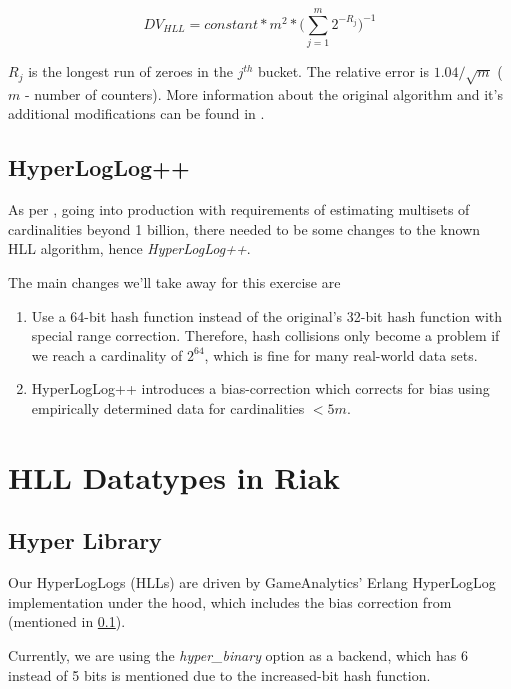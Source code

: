 \documentclass[12pt]{article}
\newlength\tindent
\renewcommand{\indent}{\hspace*{\tindent}}
\begin{document}
$$DV_{HLL} = constant * m^{2} * \Bigg(\sum_{j=1}^{m} 2^{-R_{j}}\Bigg)^{-1}$$

$R_j$ is the longest run of zeroes in the $j^{th}$ bucket. The relative error
is $1.04/\sqrt{m}$ ($m$ - number of counters). More information about the
original algorithm and it's additional modifications can be found in
\cite{Flatjolet:2007:Online}.

\subsection{HyperLogLog++}\label{hll++}

As per \cite{Heule:2013:Online}, going into production with requirements of
estimating multisets of cardinalities beyond 1 billion, there needed to be
some changes to the known HLL algorithm, hence \textit{HyperLogLog++}.\newline

The main changes we'll take away for this exercise are

\begin{enumerate}
\item Use a 64-bit hash function instead of the
  original's\cite{Flatjolet:2007:Online} 32-bit hash function with special range
  correction. Therefore, hash collisions only become a problem if we reach a
  cardinality of $2^{64}$, which is fine for many real-world data sets.
\item HyperLogLog++ introduces a bias-correction which corrects for bias
  using empirically determined data for cardinalities $< 5m$.
\end{enumerate}

\section{HLL Datatypes in Riak}

\subsection{Hyper Library}

Our HyperLogLogs (HLLs) are driven by GameAnalytics' Erlang HyperLogLog
implementation\cite{Hyper:Online} under the hood, which includes the bias
correction from \cite{Heule:2013:Online} (mentioned in \ref{hll++}).

\indent Currently, we are using the \textit{hyper\_binary} option as a backend,
which has  6 instead of 5 bits is
mentioned due to the increased-bit hash function.
\end{document}
